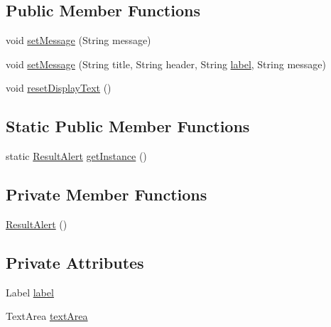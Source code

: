 \subsection*{Public Member Functions}
\begin{DoxyCompactItemize}
\item 
void \mbox{\hyperlink{classui_1_1_u_i_elements_1_1_result_alert_a540b3c6bfce9a590488f1b32c23cf1f5}{set\+Message}} (String message)
\item 
void \mbox{\hyperlink{classui_1_1_u_i_elements_1_1_result_alert_a287499be420acb3e4140cfc2464d3f32}{set\+Message}} (String title, String header, String \mbox{\hyperlink{classui_1_1_u_i_elements_1_1_result_alert_a7202166f7198758dadd7d0ccd96c2397}{label}}, String message)
\item 
void \mbox{\hyperlink{classui_1_1_u_i_elements_1_1_result_alert_ac15ce87d85f7eb1b88aa3ae6f8d6b8e9}{reset\+Display\+Text}} ()
\end{DoxyCompactItemize}
\subsection*{Static Public Member Functions}
\begin{DoxyCompactItemize}
\item 
static \mbox{\hyperlink{classui_1_1_u_i_elements_1_1_result_alert}{Result\+Alert}} \mbox{\hyperlink{classui_1_1_u_i_elements_1_1_result_alert_ae42b2e0b388584d71db12f4a5798a684}{get\+Instance}} ()
\end{DoxyCompactItemize}
\subsection*{Private Member Functions}
\begin{DoxyCompactItemize}
\item 
\mbox{\hyperlink{classui_1_1_u_i_elements_1_1_result_alert_a9e69ed8cdc106169078f4950b97d35a1}{Result\+Alert}} ()
\end{DoxyCompactItemize}
\subsection*{Private Attributes}
\begin{DoxyCompactItemize}
\item 
Label \mbox{\hyperlink{classui_1_1_u_i_elements_1_1_result_alert_a7202166f7198758dadd7d0ccd96c2397}{label}}
\item 
Text\+Area \mbox{\hyperlink{classui_1_1_u_i_elements_1_1_result_alert_a5964631850a9e7144601e744b9148b8d}{text\+Area}}
\end{DoxyCompactItemize}
